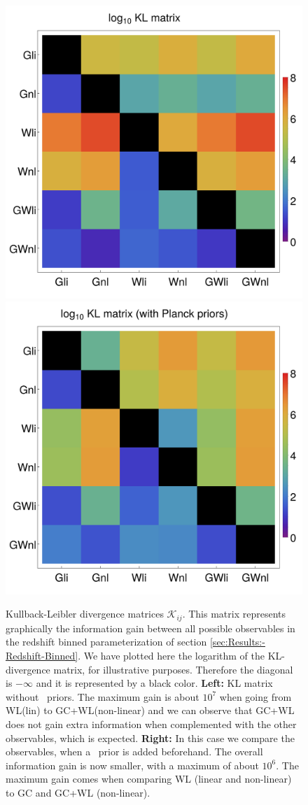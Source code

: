 \begin{figure}[h]
	\centering
	\includegraphics[width=0.45\linewidth]{Chapters/linear-nonlinear-MG-forecasts/figures/KL-divergence/KL-Matrix-all-obs-noPlanck-new}
	\includegraphics[width=0.45\linewidth]{Chapters/linear-nonlinear-MG-forecasts/figures/KL-divergence/KL-Matrix-all-obs-withPlanck-new}
	\caption[Kullback-Leibler divergence matrices for Euclid forecasts.]{Kullback-Leibler divergence matrices $\mathcal{K}_{ij}$. This matrix represents graphically
		the information gain between all possible observables in the redshift
		binned parameterization of section \ref{sec:Results:-Redshift-Binned}. 
		We have plotted here the logarithm of the KL-divergence matrix, for illustrative purposes. 
		Therefore the diagonal is $-\infty$ and it is represented by a black color. 
		\textbf{Left:} KL matrix without \planck\ priors. 
		The maximum gain is about $10^7$ when going from WL(lin) to GC+WL(non-linear) 
		and we can observe that GC+WL does not gain extra information when complemented with the other observables, which is expected.
		\textbf{Right:} In this case we compare the observables, when a \planck\ prior is added beforehand. 
		The overall information gain is now smaller, with a maximum of about $10^6$. 
		The maximum gain comes when comparing WL (linear and non-linear) to GC and GC+WL (non-linear). 
	}
	\label{fig:kl-matrices}
\end{figure}



